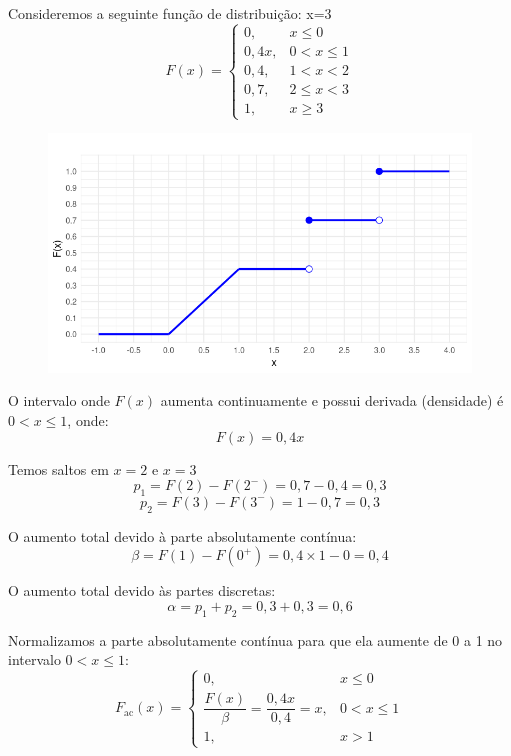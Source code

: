 \begin{frame}
	\small
\begin{exem}
Consideremos a seguinte função de distribuição:
x=3 \[
F(x) = \begin{cases}
	0, & x \leq 0 \\
	0,4 x, & 0 < x \leq 1 \\
	0,4, & 1 < x < 2 \\
	0,7, & 2 \leq x < 3 \\
	1, & x \geq 3
\end{cases}
\]
\end{exem}		
\begin{figure}[!htbp]
	\begin{center}
		\includegraphics[scale=0.5]{
			grafFExemDEc.png}
	\end{center}
\end{figure}

\end{frame}	

\begin{frame}
O intervalo onde \( F(x) \) aumenta continuamente e possui derivada (densidade) é \( 0 < x \leq 1 \), onde:
\[
F(x) = 0{,}4 x
\]	

Temos saltos em $x=2$ e $x=3$
    \[
p_1 = F(2) - F(2^-) = 0{,}7 - 0{,}4 = 0{,}3
\]
    \[
p_2 = F(3) - F(3^-) = 1 - 0{,}7 = 0{,}3
\]
	
O aumento total devido à parte absolutamente contínua:
\[
\beta = F(1) - F(0^+) = 0{,}4 \times 1 - 0 = 0{,}4
\]	

O aumento total devido às partes discretas:
\[
\alpha = p_1+ p_2 = 0{,}3 + 0{,}3 = 0{,}6
\]

Normalizamos a parte absolutamente contínua para que ela aumente de 0 a 1 no intervalo \( 0 < x \leq 1 \):
\[
F_{\text{ac}}(x) = \begin{cases}
	0, & x \leq 0 \\
	\dfrac{F(x)}{\beta} = \dfrac{0{,}4 x}{0{,}4} = x, & 0 < x \leq 1 \\
	1, & x > 1
\end{cases}
\]
\end{frame}	

